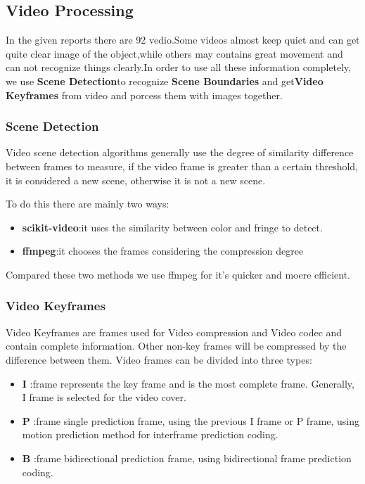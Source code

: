 \documentclass[12pt]{article}
\begin{document}
\subsection{Video Processing}
In the given reports there are 92 vedio.Some videos almost keep quiet and can get quite clear image of the object,while others may contains great movement and can not recognize things clearly.In order to use all these information completely, we use \textbf{Scene Detection}to recognize \textbf{Scene Boundaries} and get\textbf{Video Keyframes} from video and porcess them with images together.

\subsubsection{Scene Detection}
Video scene detection algorithms generally use the degree of similarity difference between frames to measure, if the video frame is greater than a certain threshold, it is considered a new scene, otherwise it is not a new scene.

To do this there are mainly two ways:
\begin{itemize}
	\item \textbf{scikit-video}\cite{scikitvideo}:it uses the similarity between color and fringe to detect.
	\item \textbf{ffmpeg}\cite{ffmpeg}:it chooses the frames considering the compression degree
\end{itemize}
Compared these two methods we use ffmpeg for it's quicker and moere efficient.

\subsubsection{Video Keyframes}
Video Keyframes are frames used for Video compression and Video codec and contain complete information. Other non-key frames will be compressed by the difference between them. Video frames can be divided into three types:
\begin{itemize}
	\item \textbf{I} :frame represents the key frame and is the most complete frame. Generally, I frame is selected for the video cover.
	\item \textbf{P} :frame single prediction frame, using the previous I frame or P frame, using motion prediction method for interframe prediction coding.
	\item \textbf{B} :frame bidirectional prediction frame, using bidirectional frame prediction coding.
\end{itemize}
\end{document}
